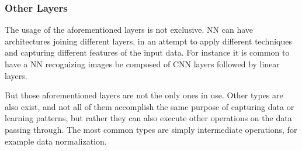 \documentclass[a4paper, 11pt]{report}
\begin{document}
\subsubsection{Other Layers}\label{Theory: Other layers}
The usage of the aforementioned layers is not exclusive. NN can have architectures joining different layers, in an attempt to apply different techniques and capturing different features of the input data. For instance it is common to have a NN recognizing images be composed of CNN layers followed by linear layers.

But those aforementioned layers are not the only ones in use. Other types are also exist, and not all of them accomplish the same purpose of capturing data or learning patterns, but rather they can also execute other operations on the data passing through. The most common types are simply intermediate operations, for example data normalization.
\end{document}
